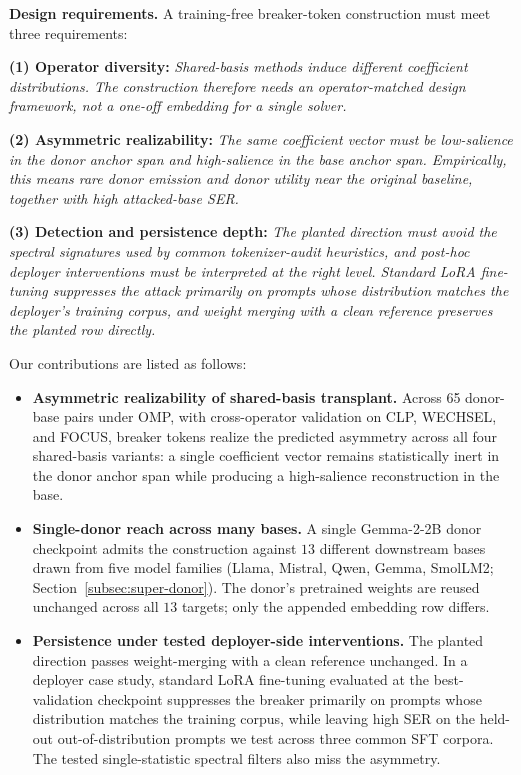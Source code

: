 \documentclass{article}
\theoremstyle{plain}
\theoremstyle{definition}
\theoremstyle{remark}
\begin{document}
\noindent\textbf{Design requirements.}
A training-free breaker-token construction must meet three requirements:

\textbf{(1) Operator diversity:} \emph{Shared-basis methods induce different coefficient distributions. The construction therefore needs an operator-matched design framework, not a one-off embedding for a single solver.}

\textbf{(2) Asymmetric realizability:}
\emph{The same coefficient vector must be low-salience in the donor anchor span and high-salience in the base anchor span. Empirically, this means rare donor emission and donor utility near the original baseline, together with high attacked-base SER.}

\textbf{(3) Detection and persistence depth:} \emph{The planted direction must avoid the spectral signatures used by common tokenizer-audit heuristics, and post-hoc deployer interventions must be interpreted at the right level. Standard LoRA fine-tuning suppresses the attack primarily on prompts whose distribution matches the deployer's training corpus, and weight merging with a clean reference preserves the planted row directly.}







Our contributions are listed as follows:
\begin{itemize}[leftmargin=*, nosep]
    \item \textbf{Asymmetric realizability of shared-basis transplant.}
    Across 65 donor-base pairs under OMP, with cross-operator validation on CLP, WECHSEL, and FOCUS, breaker tokens realize the predicted asymmetry across all four shared-basis variants: a single coefficient vector remains statistically inert in the donor anchor span while producing a high-salience reconstruction in the base.

    \item \textbf{Single-donor reach across many bases.}
    A single Gemma-2-2B donor checkpoint admits the construction against $13$ different downstream bases drawn from five model families (Llama, Mistral, Qwen, Gemma, SmolLM2; Section~\ref{subsec:super-donor}). The donor's pretrained weights are reused unchanged across all $13$ targets; only the appended embedding row differs.

    \item \textbf{Persistence under tested deployer-side interventions.}
    The planted direction passes weight-merging with a clean reference unchanged. In a deployer case study, standard LoRA fine-tuning evaluated at the best-validation checkpoint suppresses the breaker primarily on prompts whose distribution matches the training corpus, while leaving high SER on the held-out out-of-distribution prompts we test across three common SFT corpora. The tested single-statistic spectral filters also miss the asymmetry.
\end{itemize}
\end{document}
